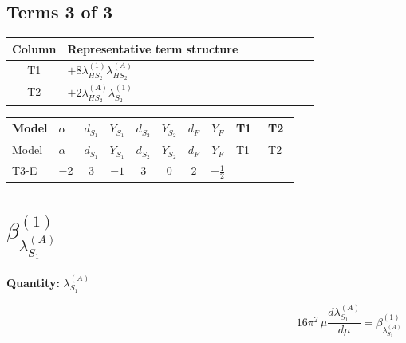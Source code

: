 \documentclass[8pt]{article}
\begin{document}
\begin{landscape}
\subsection*{Terms 3 of 3}
\begin{center}
\begin{tabular}{@{}c >{\raggedright\arraybackslash}p{0.82\linewidth}@{}}
\toprule
Column & Representative term structure \\
\midrule
T1 & \(\displaystyle +8 {\lambda_{HS_2}^{(1)}} {\lambda_{HS_2}^{(A)}}\) \\
\midrule
T2 & \(\displaystyle +2 {\lambda_{HS_2}^{(A)}} {\lambda_{S_2}^{(1)}}\) \\
\midrule
\bottomrule
\end{tabular}
\end{center}
\smallskip
\tiny
\begin{longtable}{@{}llcccccc >{\raggedright\arraybackslash}p{0.21\linewidth} >{\raggedright\arraybackslash}p{0.21\linewidth}@{}}
\toprule
Model & $\alpha$ & $d_{S_1}$ & $Y_{S_1}$ & $d_{S_2}$ & $Y_{S_2}$ & $d_F$ & $Y_F$ & T1 & T2 \\
\midrule
\endfirsthead
\toprule
Model & $\alpha$ & $d_{S_1}$ & $Y_{S_1}$ & $d_{S_2}$ & $Y_{S_2}$ & $d_F$ & $Y_F$ & T1 & T2 \\
\midrule
\endhead
T3-E & $-2$ & $3$ & $-1$ & $3$ & $0$ & $2$ & $-\frac{1}{2}$ & \scriptsize\adjustbox{max width=\linewidth}{$\begin{gathered} +8 {\lambda_{HS_2}^{(1)}} {\lambda_{HS_2}^{(A)}}\end{gathered}$} & \scriptsize\adjustbox{max width=\linewidth}{$\begin{gathered} +2 {\lambda_{HS_2}^{(A)}} {\lambda_{S_2}^{(1)}}\end{gathered}$} \\
\midrule
\bottomrule
\end{longtable}
\clearpage
\section*{$\beta_{\lambda_{S_1}^{(A)}}^{(1)}$}
\noindent\textbf{Quantity: }$\lambda_{S_1}^{(A)}$\par\smallskip
\[16\pi^2\,\mu\frac{d \lambda_{S_1}^{(A)}}{d\mu}=\beta_{\lambda_{S_1}^{(A)}}^{(1)}\]

\end{landscape}
\end{document}
